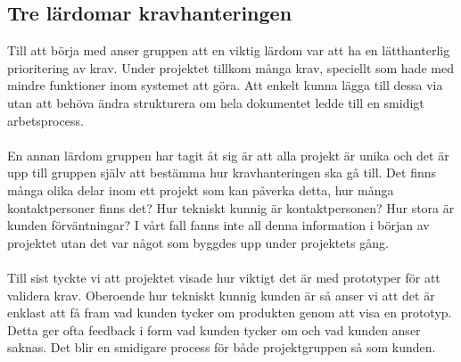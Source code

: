 \documentclass[12pt]{article}
\begin{document}
\subsection{Tre lärdomar kravhanteringen}
Till att börja med anser gruppen att en viktig lärdom var att ha en lätthanterlig prioritering av krav. Under projektet tillkom många krav, speciellt som hade med mindre funktioner inom systemet att göra. Att enkelt kunna lägga till dessa via utan att behöva ändra strukturera om hela dokumentet ledde till en smidigt arbetsprocess.
\\\\
En annan lärdom gruppen har tagit åt sig är att alla projekt är unika och det är upp till gruppen själv att bestämma hur kravhanteringen ska gå till. Det finns många olika delar inom ett projekt som kan påverka detta, hur många kontaktpersoner finns det? Hur tekniskt kunnig är kontaktpersonen? Hur stora är kunden förväntningar? I vårt fall fanns inte all denna information i början av projektet utan det var något som byggdes upp under projektets gång. 
\\\\
Till sist tyckte vi att projektet visade hur viktigt det är med prototyper för att validera krav. Oberoende hur tekniskt kunnig kunden är så anser vi att det är enklast att få fram vad kunden tycker om produkten genom att visa en prototyp. Detta ger ofta feedback i form vad kunden tycker om och vad kunden anser saknas. Det blir en smidigare process för både projektgruppen så som kunden.




\end{document}
